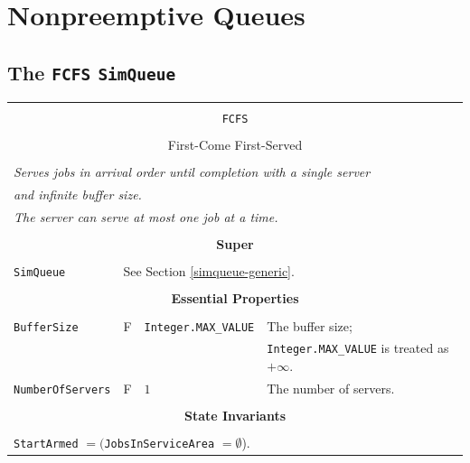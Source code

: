 \documentclass[12pt]{book}
\begin{document}
\section{Nonpreemptive Queues}

\subsection{The \lstinline{FCFS} \lstinline{SimQueue}}
\label{sec:FCFS}

\begin{tabular}{|l|l|l|l|}
\hline
\multicolumn{4}{|c|}{} \\
\multicolumn{4}{|c|}{\lstinline[basicstyle=\large]{FCFS}} \\
\multicolumn{4}{|c|}{} \\
\multicolumn{4}{|c|}{First-Come First-Served} \\
\multicolumn{4}{|c|}{} \\
\hline
\multicolumn{4}{|l|}{\em Serves jobs in arrival order until completion with a single server} \\
\multicolumn{4}{|l|}{\em and infinite buffer size.} \\
\multicolumn{4}{|l|}{\em The server can serve at most one job at a time.} \\
\hline
\multicolumn{4}{|c|}{} \\
\multicolumn{4}{|c|}{\bf Super} \\
\multicolumn{4}{|c|}{} \\
\hline
\lstinline|SimQueue| & \multicolumn{3}{|l|}{See Section \ref{simqueue-generic}.} \\
\hline
\multicolumn{4}{|c|}{} \\
\multicolumn{4}{|c|}{\bf Essential Properties} \\
\multicolumn{4}{|c|}{} \\
\hline
\lstinline|BufferSize|      & F & \lstinline|Integer.MAX_VALUE|
                            & The buffer size; \\
                        & & & \lstinline|Integer.MAX_VALUE| is treated as $+\infty$. \\
\hline
\lstinline|NumberOfServers| & F & $1$
                            & The number of servers. \\
\hline
\multicolumn{4}{|c|}{} \\
\multicolumn{4}{|c|}{\bf State  Invariants} \\
\multicolumn{4}{|c|}{} \\
\hline
\multicolumn{4}{|l|}{\lstinline|StartArmed| $= ($\lstinline|JobsInServiceArea| $= \emptyset$).} \\

\end{tabular}
\end{document}
